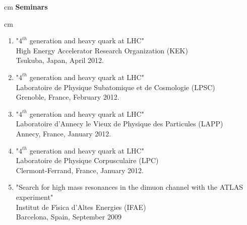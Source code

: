 \documentclass[12pt]{article}
\begin{document}


 cm
{\bf  \large  Seminars}

 cm

\begin{enumerate} 

\item "$4^{th}$ generation and heavy quark at LHC"\\
High Energy Accelerator Research Organization (KEK)\\
Tsukuba, Japan, April 2012.

\item "$4^{th}$ generation and heavy quark at LHC"\\
Laboratoire de Physique Subatomique et de Cosmologie (LPSC)\\
Grenoble, France, February 2012.

\item "$4^{th}$ generation and heavy quark at LHC"\\
Laboratoire d'Annecy le Vieux de Physique des Particules (LAPP)\\
Annecy, France, January 2012.

\item "$4^{th}$ generation and heavy quark at LHC"\\
Laboratoire de Physique Corpusculaire (LPC)\\
Clermont-Ferrand, France, January 2012.

\item "Search for high mass resonances in the dimuon channel with the ATLAS experiment"\\
Institut de F\'{\i}sica d'Altes Energies (IFAE)\\
Barcelona, Spain, September 2009

\end{enumerate}
\end{document}
